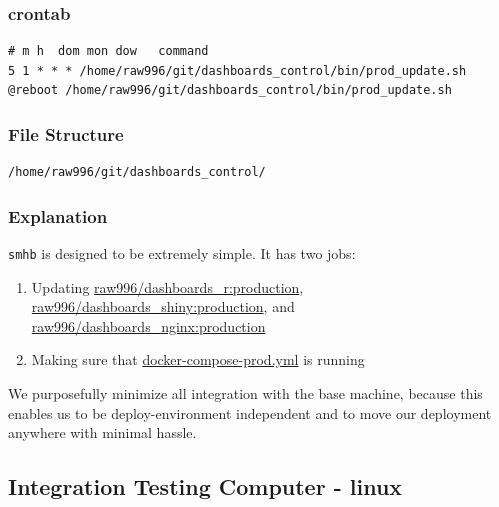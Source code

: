 \documentclass[12pt,]{article}
\providecommand{\tightlist}{%
  \setlength{\itemsep}{0pt}\setlength{\parskip}{0pt}}
\begin{document}
\subsubsection{crontab}\label{crontab}

\begin{verbatim}
# m h  dom mon dow   command
5 1 * * * /home/raw996/git/dashboards_control/bin/prod_update.sh
@reboot /home/raw996/git/dashboards_control/bin/prod_update.sh
\end{verbatim}

\subsubsection{File Structure}\label{file-structure}

\begin{verbatim}
/home/raw996/git/dashboards_control/
\end{verbatim}

\subsubsection{Explanation}\label{explanation}

\texttt{smhb} is designed to be extremely simple. It has two jobs:

\begin{enumerate}
\def\labelenumi{\arabic{enumi}.}
\tightlist
\item
  Updating
  \href{https://hub.docker.com/r/raw996/dashboards_r/}{raw996/dashboards\_r:production},
  \href{https://hub.docker.com/r/raw996/dashboards_shiny/}{raw996/dashboards\_shiny:production},
  and
  \href{https://hub.docker.com/r/raw996/dashboards_nginx/}{raw996/dashboards\_nginx:production}
\item
  Making sure that
  \href{https://github.com/raubreywhite/dashboards_control/blob/master/infrastructure/docker-compose-prod.yml}{docker-compose-prod.yml}
  is running
\end{enumerate}

We purposefully minimize all integration with the base machine, because
this enables us to be deploy-environment independent and to move our
deployment anywhere with minimal hassle.

\hypertarget{integrationtesting}{\subsection{Integration Testing
Computer - linux}\label{integrationtesting}}
\end{document}
